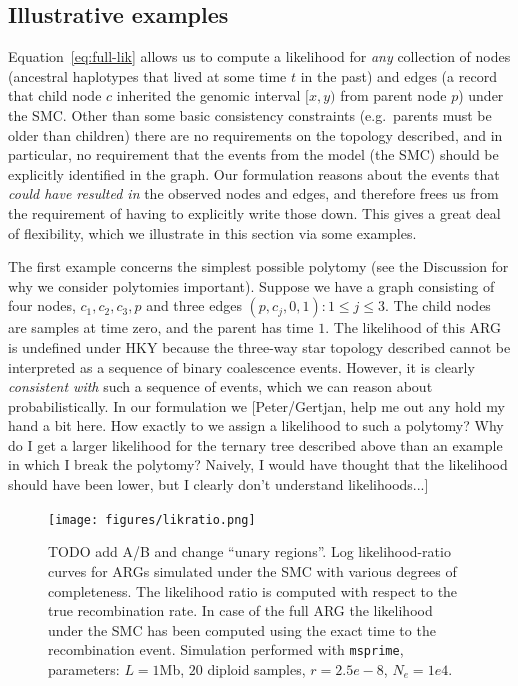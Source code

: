 \documentclass{article}
\begin{document}
\subsection*{Illustrative examples}

Equation~\eqref{eq:full-lik} allows us to compute a likelihood for \emph{any}
collection of nodes (ancestral haplotypes that lived at some time 
$t$ in the past) and edges (a record that child node $c$ 
inherited the genomic interval $[x, y)$ from parent node $p$)
under the SMC. Other than some basic consistency constraints (e.g.\ parents
must be older than children) there are no requirements on the topology
described, and in particular, no requirement that the events from the 
model (the SMC) should be explicitly identified in the graph. Our 
formulation reasons about the events that \emph{could have resulted in}
the observed nodes and edges, and therefore frees us from the requirement
of having to explicitly write those down. This gives a great deal 
of flexibility, which we illustrate in this section via some examples.

The first example concerns the simplest possible polytomy (see
the Discussion for why we consider polytomies important).
Suppose we have a graph consisting of four nodes, $c_1,c_2,c_3,p$ and three edges
${(p, c_j, 0, 1): 1 \leq j \leq 3}$. The child nodes are samples at time
zero, and the parent has time $1$. The likelihood of this ARG is undefined
under HKY because the three-way star topology described cannot be interpreted as 
a sequence of binary coalescence events. However, it is clearly 
\emph{consistent with} such a sequence of events, which we can reason
about probabilistically. In our formulation we [Peter/Gertjan, help me 
out any hold my hand a bit here. How exactly to we assign a likelihood
to such a polytomy? Why do I get a larger likelihood for the ternary
tree described above than an example in which I break the polytomy? 
Naively, I would have thought that the likelihood should have been 
lower, but I clearly don't understand likelihoods...]

\begin{figure}
    \centering
    \texttt{[image: figures/likratio.png]}
    \caption{TODO add A/B and change ``unary regions''.
    Log likelihood-ratio curves for ARGs simulated under the SMC with
    various degrees of completeness. The likelihood ratio is computed with
    respect to the true recombination rate. In case of the full ARG the likelihood
    under the SMC has been computed using the exact time to the recombination event.
    Simulation performed with \texttt{msprime}, parameters: $L=1$Mb, $20$ diploid samples,
    $r=2.5e-8$, $N_e=1e4$.}
    \label{fig:lik-surface}
\end{figure}
\end{document}
